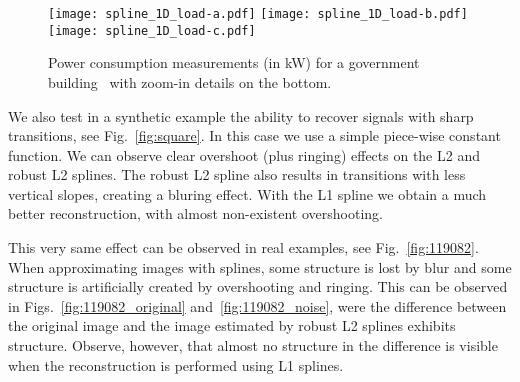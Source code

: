 \documentclass[preprint]{imsart}
\begin{document}
\begin{figure}
    
    \centerline{
        \hfill
        \texttt{[image: spline\_1D\_load-a.pdf]}
        \hfill
        \texttt{[image: spline\_1D\_load-b.pdf]}
        \hfill
        \texttt{[image: spline\_1D\_load-c.pdf]}
        \hfill
    }
    \caption{Power consumption measurements (in kW) for a government building~\protect\cite{mateos12} with zoom-in details on the bottom.}
    \label{fig:load}
\end{figure}

We also test in a synthetic example the ability to recover signals with sharp transitions, see Fig.~\ref{fig:square}. In this case we use a simple piece-wise constant function. We can observe clear overshoot (plus ringing) effects on the L2 and robust L2 splines. The robust L2 spline also results in transitions with less vertical slopes, creating a bluring effect. With the L1 spline we obtain a much better reconstruction, with almost non-existent overshooting.

\begin{figure*}
    \centerline{
    \hfill
    \hfill
    \hfill
    \hfill
    }
    
    \caption{In the case of a periodic piece-wise constant signal, the L2 and robust L2 approximations exhibit overshoot and ringing (see zoom-in details on the bottom). These effects are much attenuated by the L1 spline approximation.}
    \label{fig:square}
\end{figure*}

This very same effect can be observed in real examples, see Fig.~\ref{fig:119082}. When approximating images with splines, some structure is lost by blur and some structure is artificially created by overshooting and ringing. This can be observed in Figs.~\ref{fig:119082_original} and~\ref{fig:119082_noise}, were the difference between the original image and the image estimated by robust L2 splines exhibits structure. Observe, however, that almost no structure in the difference is visible when the reconstruction is performed using L1 splines.
\end{document}
